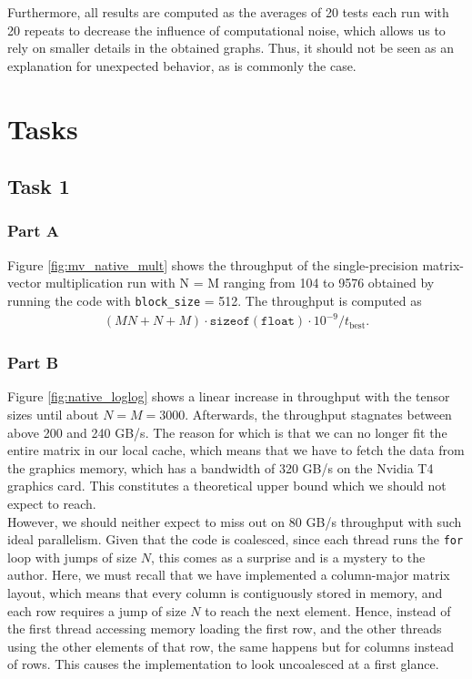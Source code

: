 \documentclass[9pt]{article}
\begin{document}
Furthermore, all results are computed as the averages of 20 tests each run with 20 repeats to decrease the influence of computational noise, which allows us to rely on smaller details in the obtained graphs. Thus, it should not be seen as an explanation for unexpected behavior, as is commonly the case. 
\section{Tasks}
\subsection{Task 1}
\subsubsection{Part A}
Figure \ref{fig:mv_native_mult} shows the throughput of the single-precision matrix-vector multiplication run with N = M ranging from 104 to 9576 obtained by running the code with \texttt{block\_size} = 512. The throughput is computed as
\begin{align*}
    (MN + N + M)\cdot\texttt{sizeof}(\texttt{float})\cdot 10^{-9}/t_{\text{best}}.
\end{align*}
\subsubsection{Part B}
Figure \ref{fig:native_loglog} shows a linear increase in throughput with the tensor sizes until about $N=M=3000$. Afterwards, the throughput stagnates between above 200 and 240 GB/s. The reason for which is that we can no longer fit the entire matrix in our local cache, which means that we have to fetch the data from the graphics memory, which has a bandwidth of 320 GB/s on the Nvidia T4 graphics card. This constitutes a theoretical upper bound which we should not expect to reach. \\

However, we should neither expect to miss out on 80 GB/s throughput with such ideal parallelism. Given that the code is coalesced, since each thread runs the \texttt{for} loop with jumps of size $N$, this comes as a surprise and is a mystery to the author. Here, we must recall that we have implemented a column-major matrix layout, which means that every column is contiguously stored in memory, and each row requires a jump of size $N$ to reach the next element. Hence, instead of the first thread accessing memory loading the first row, and the other threads using the other elements of that row, the same happens but for columns instead of rows. This causes the implementation to look uncoalesced at a first glance. \\
\end{document}
